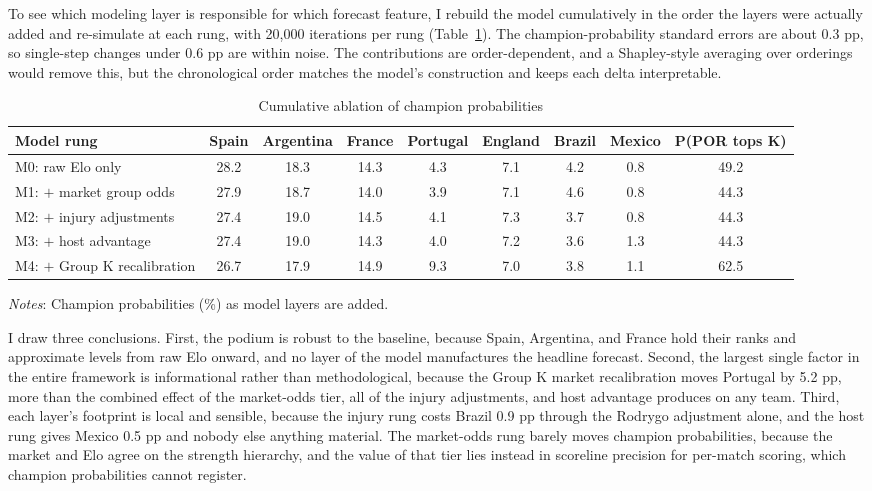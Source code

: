 \documentclass[11pt,letterpaper]{article}
\begin{document}
To see which modeling layer is responsible for which forecast feature, I rebuild the model cumulatively in the order the layers were actually added and re-simulate at each rung, with 20{,}000 iterations per rung (Table~\ref{tab:ablation}). The champion-probability standard errors are about 0.3 pp, so single-step changes under 0.6 pp are within noise. The contributions are order-dependent, and a Shapley-style averaging over orderings would remove this, but the chronological order matches the model's construction and keeps each delta interpretable.

\begin{table}[!t]
  \centering
  \caption{Cumulative ablation of champion probabilities}\label{tab:ablation}
  \begin{footnotesize}
  \begin{threeparttable}
    {\footnotesize\begin{tabular*}{\textwidth}{@{\extracolsep{\fill}} lcccccccc}
      \toprule
      Model rung & Spain & Argentina & France & Portugal & England & Brazil & Mexico & P(POR tops K) \\
      \midrule
      M0: raw Elo only          & 28.2 & 18.3 & 14.3 & 4.3 & 7.1 & 4.2 & 0.8 & 49.2 \\
      M1: $+$ market group odds & 27.9 & 18.7 & 14.0 & 3.9 & 7.1 & 4.6 & 0.8 & 44.3 \\
      M2: $+$ injury adjustments& 27.4 & 19.0 & 14.5 & 4.1 & 7.3 & 3.7 & 0.8 & 44.3 \\
      M3: $+$ host advantage    & 27.4 & 19.0 & 14.3 & 4.0 & 7.2 & 3.6 & 1.3 & 44.3 \\
      M4: $+$ Group K recalibration & 26.7 & 17.9 & 14.9 & 9.3 & 7.0 & 3.8 & 1.1 & 62.5 \\
      \bottomrule
    \end{tabular*}}
    \begin{tablenotes}\notesize
      \item \textit{Notes}: Champion probabilities (\%) as model layers are added.
    \end{tablenotes}
  \end{threeparttable}
  \end{footnotesize}
\end{table}

I draw three conclusions. First, the podium is robust to the baseline, because Spain, Argentina, and France hold their ranks and approximate levels from raw Elo onward, and no layer of the model manufactures the headline forecast. Second, the largest single factor in the entire framework is informational rather than methodological, because the Group K market recalibration moves Portugal by 5.2 pp, more than the combined effect of the market-odds tier, all of the injury adjustments, and host advantage produces on any team. Third, each layer's footprint is local and sensible, because the injury rung costs Brazil 0.9 pp through the Rodrygo adjustment alone, and the host rung gives Mexico 0.5 pp and nobody else anything material. The market-odds rung barely moves champion probabilities, because the market and Elo agree on the strength hierarchy, and the value of that tier lies instead in scoreline precision for per-match scoring, which champion probabilities cannot register.
\end{document}
